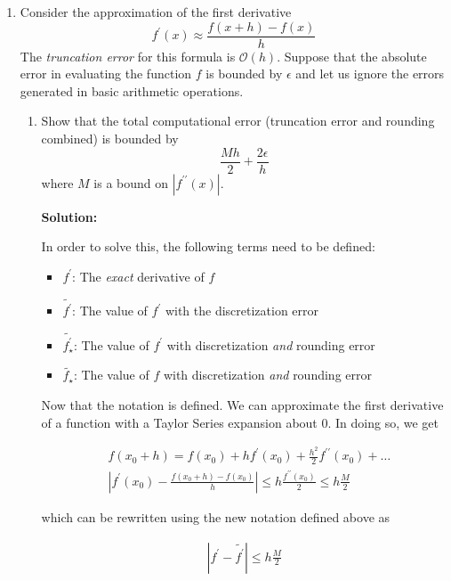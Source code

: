 \documentclass[12pt]{article}
\begin{document}
\begin{enumerate}
\begin{enumerate}
\end{enumerate}

\item Consider the approximation of the first derivative
\[
f^{\prime}(x) \approx \frac{f(x+h)-f(x)}{h}
\]
The {\em truncation error} for this formula is $\mathcal{O}(h)$. Suppose that the
absolute error in evaluating the function $f$ is bounded by $\epsilon$ and
let us ignore the errors generated in basic arithmetic operations.
\begin{enumerate}
\item Show that the total computational error (truncation error and rounding combined)
is bounded by
\[
\frac{Mh}{2} + \frac{2\epsilon}{h}
\]
where $M$ is a bound on $\left| f^{\prime\prime}(x)\right|$.

{\bf Solution:}

In order to solve this, the following terms need to be defined:

\begin{itemize}
\item $f^{\prime}$: The {\em exact} derivative of $f$
\item $\widetilde{f^{\prime}}$: The value of $f^{\prime}$ with the discretization error
\item $\widetilde{f^{\prime}_{\star}}$: The value of $f^{\prime}$ with discretization {\em and} rounding error
\item $\widetilde{f_{\star}}$: The value of $f$ with discretization {\em and} rounding error
\end{itemize}

Now that the notation is defined. We can approximate the first derivative of a
function with a Taylor Series expansion about 0. In doing so, we get

\begin{align*}
&f\left(x_{0} + h\right)  = f\left(x_{0}\right) + hf^{\prime}\left(x_{0}\right) + \frac{h^{2}}{2}f^{\prime \prime}\left(x_{0}\right) + \ldots\\
&\left| f^{\prime}\left(x_{0}\right) - \frac{f\left(x_{0}+h\right) - f\left(x_{0}\right)}{h}\right| \leq h\frac{f^{\prime\prime}\left(x_{0}\right)}{2} \leq h\frac{M}{2}
\end{align*}

which can be rewritten using the new notation defined above as

\begin{align*}
\left| f^{\prime} - \widetilde{f^{\prime}} \right| \leq h\frac{M}{2}
\end{align*}


\end{enumerate}
\end{enumerate}
\end{document}
